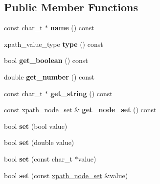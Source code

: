 \subsection*{Public Member Functions}
\begin{DoxyCompactItemize}
\item 
\hypertarget{classpugi_1_1xpath__variable_adfee2f69aadd5a9fd36ba67ea9f11c9c}{const char\+\_\+t $\ast$ {\bfseries name} () const }\label{classpugi_1_1xpath__variable_adfee2f69aadd5a9fd36ba67ea9f11c9c}

\item 
\hypertarget{classpugi_1_1xpath__variable_a33713853d1298ce11fb382258ffe11d4}{xpath\+\_\+value\+\_\+type {\bfseries type} () const }\label{classpugi_1_1xpath__variable_a33713853d1298ce11fb382258ffe11d4}

\item 
\hypertarget{classpugi_1_1xpath__variable_a2d562014ddb3c9f0a2d6b8f36f3adc36}{bool {\bfseries get\+\_\+boolean} () const }\label{classpugi_1_1xpath__variable_a2d562014ddb3c9f0a2d6b8f36f3adc36}

\item 
\hypertarget{classpugi_1_1xpath__variable_aad1197f1eecb6072794389eb997d539a}{double {\bfseries get\+\_\+number} () const }\label{classpugi_1_1xpath__variable_aad1197f1eecb6072794389eb997d539a}

\item 
\hypertarget{classpugi_1_1xpath__variable_ab6c9175201e43003c5abcdd3bc426bbf}{const char\+\_\+t $\ast$ {\bfseries get\+\_\+string} () const }\label{classpugi_1_1xpath__variable_ab6c9175201e43003c5abcdd3bc426bbf}

\item 
\hypertarget{classpugi_1_1xpath__variable_aa82f2112e66c7745066788068a14f8f5}{const \hyperlink{classpugi_1_1xpath__node__set}{xpath\+\_\+node\+\_\+set} \& {\bfseries get\+\_\+node\+\_\+set} () const }\label{classpugi_1_1xpath__variable_aa82f2112e66c7745066788068a14f8f5}

\item 
\hypertarget{classpugi_1_1xpath__variable_a1e6ee8876fba9f01373df452416e48fb}{bool {\bfseries set} (bool value)}\label{classpugi_1_1xpath__variable_a1e6ee8876fba9f01373df452416e48fb}

\item 
\hypertarget{classpugi_1_1xpath__variable_ae92b5bdaf24fa6f94f281ae5d046d56a}{bool {\bfseries set} (double value)}\label{classpugi_1_1xpath__variable_ae92b5bdaf24fa6f94f281ae5d046d56a}

\item 
\hypertarget{classpugi_1_1xpath__variable_acaedec0610338a1165bbcd0658db34f9}{bool {\bfseries set} (const char\+\_\+t $\ast$value)}\label{classpugi_1_1xpath__variable_acaedec0610338a1165bbcd0658db34f9}

\item 
\hypertarget{classpugi_1_1xpath__variable_aad7a9022098440aeac16ef90d849aee4}{bool {\bfseries set} (const \hyperlink{classpugi_1_1xpath__node__set}{xpath\+\_\+node\+\_\+set} \&value)}\label{classpugi_1_1xpath__variable_aad7a9022098440aeac16ef90d849aee4}

\end{DoxyCompactItemize}
